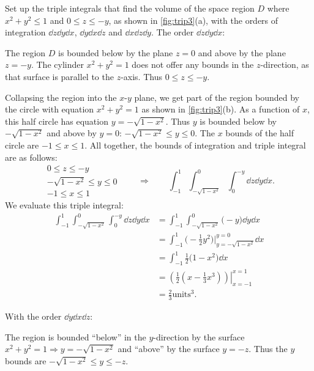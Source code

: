 \begin{example}\label{ex_trip3}%
Set up the triple integrals that find the volume of the space region $D$ where $x^2+y^2\le1$ and $0\le z\le-y$, as shown in \autoref{fig:trip3}(a), with the orders of integration $\dd z\dd y\dd x$, $\dd y\dd x\dd z$ and $\dd x\dd z\dd y$.
\solution
The order $\dd z\dd y\dd x$:\bigskip

The region $D$ is bounded below by the plane $z=0$ and above by the plane $z=-y$. The cylinder $x^2+y^2=1$ does not offer any bounds in the $z$-direction, as that surface is parallel to the $z$-axis. Thus $0\leq z\leq -y$.

Collapsing the region into the $x$-$y$ plane, we get part of the region bounded by the circle with equation $x^2+y^2=1$ as shown in \autoref{fig:trip3}(b). As a function of $x$, this half circle has equation $y=-\sqrt{1-x^2}$. Thus $y$ is bounded below by $-\sqrt{1-x^2}$ and above by $y=0$: $-\sqrt{1-x^2}\leq y\leq 0$. The $x$ bounds of the half circle are $-1\leq x\leq 1$. All together, the bounds of integration and triple integral are  as follows:
\[
 \begin{gathered}
  0\leq z\leq -y\\
  -\sqrt{1-x^2}\leq y\leq 0\\
  -1\leq x\leq 1
 \end{gathered}
 \qquad\Rightarrow\qquad
 \int_{-1}^1\int_{-\sqrt{1-x^2}}^{0}\int_0^{-y}\dd z\dd y\dd x.
\]
We evaluate this triple integral:
\begin{align*}
	\int_{-1}^1\int_{-\sqrt{1-x^2}}^{0}\int_0^{-y}\dd z\dd y\dd x
	&= \int_{-1}^1\int_{-\sqrt{1-x^2}}^{0}\bigl(-y\bigr)\dd y\dd x\\
	&=\int_{-1}^1\bigl(-\frac12y^2\bigr)\Big|_{y=-\sqrt{1-x^2}}^{y=0}\dd x\\
	&= \int_{-1}^1 \frac12\bigl(1-x^2\bigr)\dd x\\
	&= \left.\left(\frac12\left(x-\frac13x^3\right)\right)\right|_{x=-1}^{x=1}\\
	&= \frac23\text{units}^3.
\end{align*}

\noindent With the order $\dd y\dd x\dd z$:\bigskip

The region is bounded ``below'' in the $y$-direction by the surface $x^2+y^2=1 \Rightarrow y=-\sqrt{1-x^2}$ and ``above'' by the surface $y=-z$. Thus the $y$ bounds are $-\sqrt{1-x^2}\leq y\leq -z$.


\end{example}
